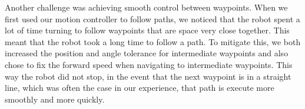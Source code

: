 \documentclass[journal]{IEEEtran}
\begin{document}
        Another challenge was achieving smooth control between waypoints. When we first used our motion controller to follow paths, we noticed that the robot spent a lot of time turning to follow waypoints that are space very close together. This meant that the robot took a long time to follow a path. To mitigate this, we both increased the position and angle tolerance for intermediate waypoints and also chose to fix the forward speed when navigating to intermediate waypoints. This way the robot did not stop, in the event that the next waypoint is in a straight line, which was often the case in our experience, that path is execute more smoothly and more quickly.
    



\end{document}
